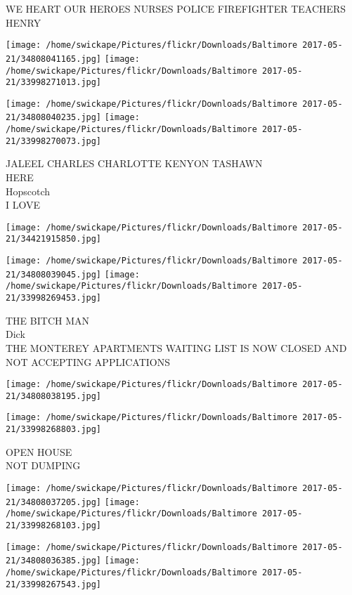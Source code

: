 \documentclass[10pt,letterpaper]{article}
\begin{document}
WE HEART OUR HEROES NURSES POLICE FIREFIGHTER TEACHERS\\
HENRY
\pagebreak

\texttt{[image: /home/swickape/Pictures/flickr/Downloads/Baltimore 2017-05-21/34808041165.jpg]}
\texttt{[image: /home/swickape/Pictures/flickr/Downloads/Baltimore 2017-05-21/33998271013.jpg]}

\texttt{[image: /home/swickape/Pictures/flickr/Downloads/Baltimore 2017-05-21/34808040235.jpg]}
\texttt{[image: /home/swickape/Pictures/flickr/Downloads/Baltimore 2017-05-21/33998270073.jpg]}

JALEEL CHARLES CHARLOTTE KENYON TASHAWN\\
HERE\\
Hopscotch\\
I LOVE
\pagebreak

\texttt{[image: /home/swickape/Pictures/flickr/Downloads/Baltimore 2017-05-21/34421915850.jpg]}

\vspace{0.25in}
\texttt{[image: /home/swickape/Pictures/flickr/Downloads/Baltimore 2017-05-21/34808039045.jpg]}
\texttt{[image: /home/swickape/Pictures/flickr/Downloads/Baltimore 2017-05-21/33998269453.jpg]}

THE BITCH MAN\\
Dick\\
THE MONTEREY APARTMENTS WAITING LIST IS NOW CLOSED AND NOT ACCEPTING APPLICATIONS
\pagebreak

\texttt{[image: /home/swickape/Pictures/flickr/Downloads/Baltimore 2017-05-21/34808038195.jpg]}

\vspace{0.25in}
\texttt{[image: /home/swickape/Pictures/flickr/Downloads/Baltimore 2017-05-21/33998268803.jpg]}

OPEN HOUSE\\
NOT DUMPING
\pagebreak

\texttt{[image: /home/swickape/Pictures/flickr/Downloads/Baltimore 2017-05-21/34808037205.jpg]}
\texttt{[image: /home/swickape/Pictures/flickr/Downloads/Baltimore 2017-05-21/33998268103.jpg]}

\texttt{[image: /home/swickape/Pictures/flickr/Downloads/Baltimore 2017-05-21/34808036385.jpg]}
\texttt{[image: /home/swickape/Pictures/flickr/Downloads/Baltimore 2017-05-21/33998267543.jpg]}
\end{document}
